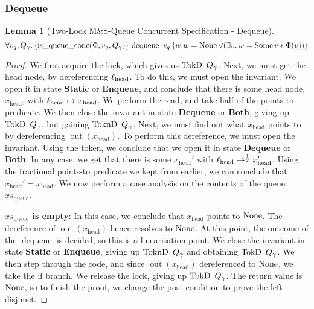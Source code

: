 \documentclass[a4paper, 10pt]{report}
\theoremstyle{definition}
\newtheorem{lemma}[theorem]{Lemma}
\newcommand{\dequeue}{\operatorname{dequeue}}
\newcommand{\msq}{M\&S-Queue\xspace}
\newcommand{\tlmsq}{Two-Lock \msq}
\newcommand{\isqueueconc}{\operatorname{is\_queue\_conc}}
\newcommand{\vq}{v_q}
\newcommand{\xsqueue}{xs_{\mathrm{queue}}}
\newcommand{\locN}[1]{\loc_{\mathrm{#1}}}
\newcommand{\lochead}{\locN{head}}
\newcommand{\nodeval}{\valB}
\newcommand{\nOut}[1]{\operatorname{out}(#1)}
\newcommand{\node}{x}
\newcommand{\nodeN}[1]{\node_{\mathrm{#1}}}
\newcommand{\nodehead}{\nodeN{head}}
\newcommand{\absvalue}{\val}
\newcommand{\StaticState}{\textbf{Static}}
\newcommand{\EnqueueState}{\textbf{Enqueue}}
\newcommand{\DequeueState}{\textbf{Dequeue}}
\newcommand{\BothState}{\textbf{Both}}
\newcommand{\Qg}{Q_\gname}
\newcommand{\TokD}[1]{\operatorname{TokD} ~ #1}
\newcommand{\TokDQg}{\TokD{\Qg}}
\newcommand{\ToknD}[1]{\operatorname{ToknD} ~ #1}
\newcommand{\ToknDQg}{\ToknD{\Qg}}
\newcommand{\tlconcspecdeq}{\All \vq, \Qg. \hoare{\isqueueconc(\Phi, \vq, \Qg)}{\dequeue \ \vq}{\nodeval . \nodeval = \None \lor (\Exists \absvalue. \nodeval = \Some \absvalue \star \Phi(\absvalue))}}
\begin{document}
\subsubsection{Dequeue}
\begin{lemma}[\tlmsq Concurrent Specification - Dequeue]\label{TLMSQ:spec:conc:dequeue}
  \begin{equation*}
    \tlconcspecdeq
  \end{equation*}
\end{lemma}
\begin{proof}
We first acquire the lock, which gives us $\TokDQg$. Next, we must get the head node, by dereferencing $\lochead$. To do this, we must open the invariant. We open it in state \StaticState{} or \EnqueueState{}, and conclude that there is some head node, $\nodehead$, with $\lochead \mapsto \nodehead$. We perform the read, and take half of the points-to predicate. We then close the invariant in state \DequeueState{} or \BothState{}, giving up $\TokDQg$, but gaining $\ToknDQg$. Next, we must find out what $\nodehead$ points to by dereferencing $\nOut{\nodehead}$. To perform this dereference, we must open the invariant. Using the token, we conclude that we open it in state \DequeueState{} or \BothState{}. In any case, we get that there is some $\nodehead'$ with $\lochead \mapsto^{\frac{1}{2}} \nodehead'$. Using the fractional points-to predicate we kept from earlier, we can conclude that $\nodehead' = \nodehead$. We now perform a case analysis on the contents of the queue: $\xsqueue$.

\textbf{$\xsqueue$ is empty}: In this case, we conclude that $\nodehead$ points to $\operatorname{None}$. The dereference of $\nOut{\nodehead}$ hence resolves to $\operatorname{None}$. At this point, the outcome of the $\dequeue$ is decided, so this is a linearisation point. We close the invariant in state \StaticState{} or \EnqueueState{}, giving up $\ToknDQg$ and obtaining $\TokDQg$. We then step through the code, and since $\nOut{\nodehead}$ dereferenced to $\operatorname{None}$, we take the if branch. We release the lock, giving up $\TokDQg$. The return value is $\operatorname{None}$, so to finish the proof, we change the post-condition to prove the left disjunct.


\end{proof}
\end{document}
